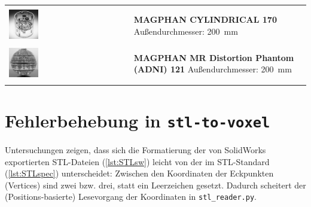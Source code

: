 \begin{table}[H]
\begin{tabularx}{\textwidth}{l X}
		&\\
		\includegraphics[width=0.25\textwidth,valign=t]{img/phantoms/Magphan.jpg} & \textbf{MAGPHAN CYLINDRICAL 170} \newline Außendurchmesser: \SI{200}{\mm} \newline \cite{mag170}  \\
		&\\
		\includegraphics[width=0.25\textwidth,valign=t]{img/phantoms/magphan121.jpg} & \textbf{MAGPHAN MR Distortion Phantom (ADNI) 121} \newline Außendurchmesser: \SI{200}{\mm} \newline \cite{mag121} \\
		&\\
		\bottomrule
		\end{tabularx}
		\label{tab:phantomsOverview}
\end{table}

\clearpage		
\section{Fehlerbehebung in \texttt{stl-to-voxel}}
\label{sec:stlToVoxFix}
Untersuchungen zeigen, dass sich die Formatierung der von SolidWorks exportierten STL-Dateien (\autoref{lst:STLsw}) leicht von der im STL-Standard (\autoref{lst:STLspec}) unterscheidet: Zwischen den Koordinaten der Eckpunkten (Vertices) sind  zwei bzw. drei, statt ein Leerzeichen gesetzt. Dadurch scheitert der (Positions-basierte) Lesevorgang der Koordinaten in \texttt{stl\_reader.py}.


